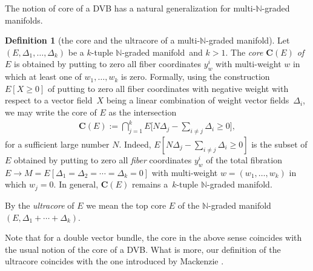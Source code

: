 \documentclass[pdftex]{sigma}
\newcommand{\grB}{{$\N$-graded manifold}}
\newcommand{\grBs}{{$\N$-graded manifolds}}
\newcommand{\N}{\mathbb{N}}
\newcommand{\ra}{\rightarrow}
\newcommand{\core}[1]{\widehat{#1}} %
\newcommand{\Core}{\mathbf{C}}
\numberwithin{equation}{section}
\theoremstyle{definition}
\newtheorem{df}[thm]{Definition}
\begin{document}
The notion of core of a DVB has a natural generalization for multi-\grBs.
\begin{df}[the core and the ultracore of a multi-\grB]\label{df:Core} Let $(E, \Delta_1, \ldots, \Delta_k)$ be a $k$-tuple \grB\ and $k>1$. The \emph{core $\Core(E)$ of $E$} is obtained by putting to zero all fiber coordinates $y^i_w$ with multi-weight $w$ in which at least one of $w_1, \ldots, w_k$ is zero.
Formally, using the construction $E[X\geq 0]$ \cite[Definition~1.8]{BGR} of putting to zero all fiber coordinates with negative weight with respect to a vector field~$X$ being a linear combination of weight vector fields~$\Delta_i$, we may write the core of $E$ as the intersection
\begin{gather*}
\Core(E):= \bigcap_{j=1}^k E\bigg[N \Delta_j - \sum_{i\neq j} \Delta_i \geq 0\bigg],
\end{gather*}
for a sufficient large number $N$. Indeed, $E[N \Delta_j - \sum_{i\neq j} \Delta_i \geq 0]$ is the subset of $E$ obtained by putting to zero all \emph{fiber} coordinates $y^i_w$ of the total fibration $E\ra M= E[\Delta_1=\Delta_2=\cdots=\Delta_k=0]$ with multi-weight $w=(w_1, \ldots, w_k)$ in which $w_j=0$. In general, $\Core(E)$ remains a~$k$-tuple \grB.

By the \emph{ultracore} of $E$ we mean the top core $\core{E}$ of the \grB\ $(E, \Delta_1+\cdots+\Delta_k)$.
\end{df}

Note that for a double vector bundle, the core in the above sense coincides with the usual notion of the core of a DVB. What is more, our definition of the ultracore coincides with the one introduced by Mackenzie
\cite{Mackenzie_Triple_VB_2005}.
\end{document}
